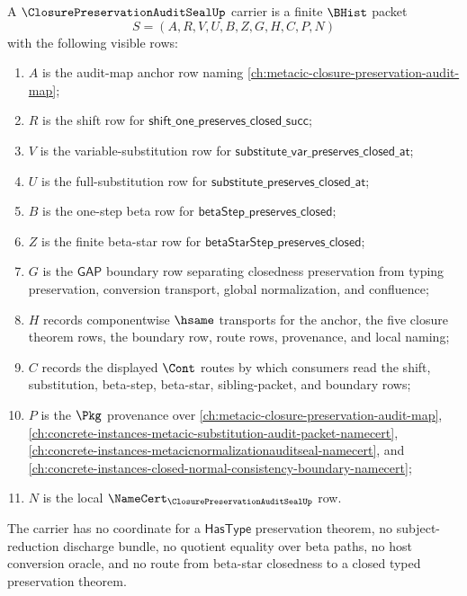 \begin{definition}
\label{def:closure-preservation-audit-seal-carrier}
A $\ClosurePreservationAuditSealUp$ carrier is a finite $\BHist$ packet
$$
S=(A,R,V,U,B,Z,G,H,C,P,N)
$$
with the following visible rows:
\begin{enumerate}
\item $A$ is the audit-map anchor row naming \autoref{ch:metacic-closure-preservation-audit-map};
\item $R$ is the shift row for $\mathsf{shift\_one\_preserves\_closed\_succ}$;
\item $V$ is the variable-substitution row for $\mathsf{substitute\_var\_preserves\_closed\_at}$;
\item $U$ is the full-substitution row for $\mathsf{substitute\_preserves\_closed\_at}$;
\item $B$ is the one-step beta row for $\mathsf{betaStep\_preserves\_closed}$;
\item $Z$ is the finite beta-star row for $\mathsf{betaStarStep\_preserves\_closed}$;
\item $G$ is the $\mathsf{GAP}$ boundary row separating closedness preservation from typing preservation, conversion transport, global normalization, and confluence;
\item $H$ records componentwise $\hsame$ transports for the anchor, the five closure theorem rows, the boundary row, route rows, provenance, and local naming;
\item $C$ records the displayed $\Cont$ routes by which consumers read the shift, substitution, beta-step, beta-star, sibling-packet, and boundary rows;
\item $P$ is the $\Pkg$ provenance over \autoref{ch:metacic-closure-preservation-audit-map}, \autoref{ch:concrete-instances-metacic-substitution-audit-packet-namecert}, \autoref{ch:concrete-instances-metacicnormalizationauditseal-namecert}, and \autoref{ch:concrete-instances-closed-normal-consistency-boundary-namecert};
\item $N$ is the local $\NameCert_{\ClosurePreservationAuditSealUp}$ row.
\end{enumerate}
The carrier has no coordinate for a $\mathsf{HasType}$ preservation theorem, no subject-reduction discharge bundle, no quotient equality over beta paths, no host conversion oracle, and no route from beta-star closedness to a closed typed preservation theorem.
\end{definition}

